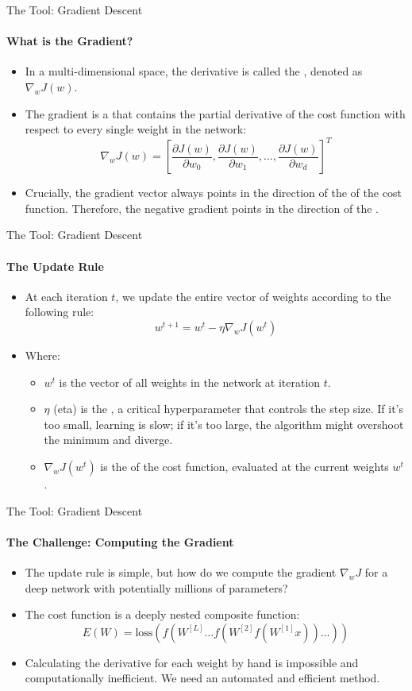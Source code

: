 \begin{frame}{The Tool: Gradient Descent}
    \framesubtitle{What is the Gradient?}
    \begin{itemize}
        \item In a multi-dimensional space, the derivative is called the , denoted as $\nabla_{w}J(w)$.
        \item The gradient is a  that contains the partial derivative of the cost function with respect to every single weight in the network:
        \[
            \nabla_{w}J(w) = \left[ \frac{\partial J(w)}{\partial w_0}, \frac{\partial J(w)}{\partial w_1}, \dots, \frac{\partial J(w)}{\partial w_d} \right]^T
        \]
        \item Crucially, the gradient vector always points in the direction of the  of the cost function. Therefore, the negative gradient points in the direction of the .
    \end{itemize}
\end{frame}

\begin{frame}{The Tool: Gradient Descent}
    \framesubtitle{The Update Rule}
    \begin{itemize}
        \item At each iteration $t$, we update the entire vector of weights according to the following rule:
        \[
            w^{t+1} = w^{t} - \eta \nabla_{w}J(w^{t})
        \]
        \item Where:
        \begin{itemize}
            \item $w^{t}$ is the vector of all weights in the network at iteration $t$.
            \item $\eta$ (eta) is the , a critical hyperparameter that controls the step size. If it's too small, learning is slow; if it's too large, the algorithm might overshoot the minimum and diverge.
            \item $\nabla_{w}J(w^{t})$ is the  of the cost function, evaluated at the current weights $w^t$.
        \end{itemize}
    \end{itemize}
\end{frame}

\begin{frame}{The Tool: Gradient Descent}
    \framesubtitle{The Challenge: Computing the Gradient}
    \begin{itemize}
        \item The update rule is simple, but how do we compute the gradient $\nabla_{w}J$ for a deep network with potentially millions of parameters?
        \item The cost function is a deeply nested composite function:
        \[ E(W) = \text{loss}(f(W^{[L]} \dots f(W^{[2]}f(W^{[1]}x))\dots)) \]
        \item Calculating the derivative for each weight by hand is impossible and computationally inefficient. We need an automated and efficient method.
    \end{itemize}
\end{frame} 

